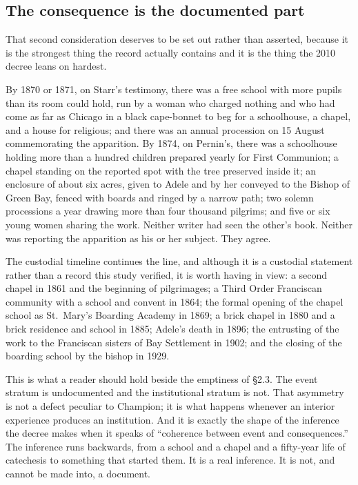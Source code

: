 \subsection{The consequence is the documented part}

That second consideration deserves to be set out rather than asserted,
because it is the strongest thing the record actually contains and it
is the thing the 2010 decree leans on hardest.

By 1870 or 1871, on Starr's testimony, there was a free school with
more pupils than its room could hold, run by a woman who charged
nothing and who had come as far as Chicago in a black cape-bonnet to
beg for a schoolhouse, a chapel, and a house for religious; and there
was an annual procession on 15 August commemorating the apparition. By
1874, on Pernin's, there was a schoolhouse holding more than a hundred
children prepared yearly for First Communion; a chapel standing on the
reported spot with the tree preserved inside it; an enclosure of about
six acres, given to Adele and by her conveyed to the Bishop of Green
Bay, fenced with boards and ringed by a narrow path; two solemn
processions a year drawing more than four thousand pilgrims; and five
or six young women sharing the work. Neither writer had seen the
other's book. Neither was reporting the apparition as his or her
subject. They agree.

The custodial timeline continues the line, and although it is a
custodial statement rather than a record this study verified, it is
worth having in view: a second chapel in 1861 and the beginning of
pilgrimages; a Third Order Franciscan community with a school and
convent in 1864; the formal opening of the chapel school as St.~Mary's
Boarding Academy in 1869; a brick chapel in 1880 and a brick residence
and school in 1885; Adele's death in 1896; the entrusting of the work
to the Franciscan sisters of Bay Settlement in 1902; and the closing of
the boarding school by the bishop in 1929.

This is what a reader should hold beside the emptiness of \S2.3. The
event stratum is undocumented and the institutional stratum is not.
That asymmetry is not a defect peculiar to Champion; it is what
happens whenever an interior experience produces an institution. And it
is exactly the shape of the inference the decree makes when it speaks
of ``coherence between event and consequences.'' The inference runs
backwards, from a school and a chapel and a fifty-year life of
catechesis to something that started them. It is a real inference. It
is not, and cannot be made into, a document.
